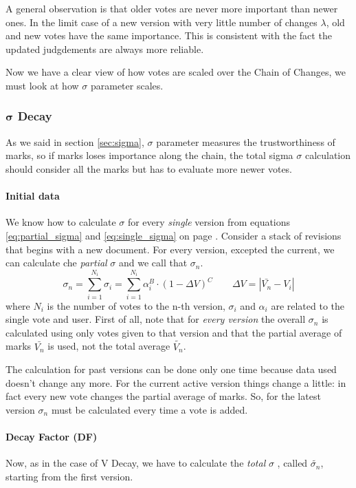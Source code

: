 \documentclass[a4paper,11pt]{article}
\newcommand{\sg}{$\sigma$ }
\begin{document}
A general observation is that older votes are never more important than newer ones. In the limit case of a new version with very little number of changes $\lambda$, old and new votes have the same importance. This is consistent with the fact the updated judgdements are always more reliable.

Now we have a clear view of how votes are scaled over the Chain of Changes, we must look at how \sg parameter scales.

\subsubsection{$\boldsymbol{\sigma}$ Decay} \label{sec:s_decay}

As we said in section \ref{sec:sigma}, \sg parameter measures the trustworthiness of marks, so if marks loses importance along the chain, the total sigma \sg calculation should consider all the marks but has to evaluate more newer votes. 
\paragraph{Initial data} We know how to calculate \sg for every \emph{single} version from equations \ref{eq:partial_sigma} and \ref{eq:single_sigma} on page \pageref{eq:partial_sigma}. Consider a stack of revisions that begins with a new document. For every version, excepted the current, we can calculate che \emph{partial} \sg and we call that $\sigma_n$. 
\begin{equation} \label{eq:sigma_partial_n}
\sigma_{n} = \sum_{i=1}^{N_i} \sigma_i = \sum_{i=1}^{N_i} \alpha_i^B \cdot \left(1- \Delta V\right)^C \qquad \Delta V = |\bar{V_n}- V_i| 
\end{equation}
where $N_i$ is the number of votes to the n-th version,  $\sigma_i$ and $\alpha_i$ are related to the single vote and user.
First of all, note that for \textit{every version} the overall $\sigma_n$ is calculated using only votes given to that version and that the partial average of marks $\bar{V_n}$ is used, not the total average $\tilde{V_n}$. 

The calculation for past versions can be done only one time because data used doesn't change any more. For the current active version things change a little: in fact every new vote changes the partial average of marks. So, for the latest version $\sigma_n$ must be calculated every time a vote is added.

\paragraph{Decay Factor (DF)} Now, as in the case of V Decay, we have to calculate the \emph{total} \sg, called $\tilde{\sigma_n}$, starting from the first version.
\end{document}

